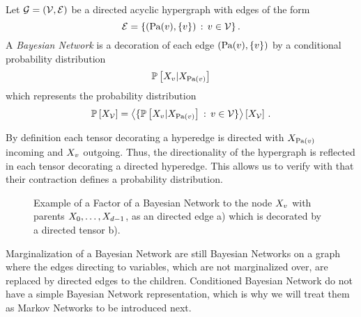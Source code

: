 \begin{definition}
    \label{def:bayesianNetwork}
    Let $\mathcal{G}=(\mathcal{V},\mathcal{E})$ be a directed acyclic hypergraph with edges of the form
    \[ \mathcal{E} = \{(\mathrm{Pa}(v),\{v\}) \, : \, v\in\mathcal{V}\} \, . \]
    A \emph{Bayesian Network} is a decoration of each edge $(\mathrm{Pa}(v),\{v\})$ by a conditional probability distribution
    \[ \mathbb{P}\left[X_{v}|X_{\mathrm{Pa}(v)}\right] \]
    which represents the probability distribution
    \begin{align*}
        \mathbb{P}\left[X_{\mathcal{V}}\right] = \left\langle \{\mathbb{P}\left[X_{v}|X_{\mathrm{Pa}(v)}\right] \,:\,v\in\mathcal{V}\}\right\rangle \left[ X_{\mathcal{V}} \right] \, .
    \end{align*}
\end{definition}

%
By definition each tensor decorating a hyperedge is directed with $X_{\mathrm{Pa}(v)}$ incoming and $X_{v}$ outgoing.
Thus, the directionality of the hypergraph is reflected in each tensor decorating a directed hyperedge.
This allows us to verify with  that their contraction defines a probability distribution.



\begin{figure}[h]
    \begin{center}
        
    \end{center}
    \caption{Example of a Factor of a Bayesian Network to the node $X_{v}$ with parents $X_{0},\ldots,X_{d-1}$, as an directed edge a) which is decorated by a directed tensor b).}
    \label{fig:BayesianFactor}
\end{figure}


Marginalization of a Bayesian Network are still Bayesian Networks on a graph where the edges directing to variables, which are not marginalized over, are replaced by directed edges to the children.
Conditioned Bayesian Network do not have a simple Bayesian Network representation, which is why we will treat them as Markov Networks to be introduced next.


